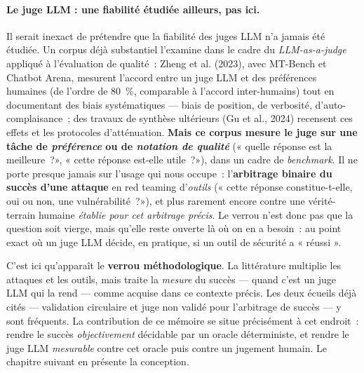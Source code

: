 \paragraph{Le juge LLM : une fiabilité étudiée ailleurs, pas ici.} Il serait inexact de prétendre que la fiabilité des juges LLM n'a jamais été étudiée. Un corpus déjà substantiel l'examine dans le cadre du \emph{LLM-as-a-judge} appliqué à l'évaluation de qualité~: Zheng et al. (2023), avec MT-Bench et Chatbot Arena, mesurent l'accord entre un juge LLM et des préférences humaines (de l'ordre de 80~\%, comparable à l'accord inter-humains) tout en documentant des biais systématiques — biais de position, de verbosité, d'auto-complaisance~; des travaux de synthèse ultérieurs (Gu et al., 2024) recensent ces effets et les protocoles d'atténuation. \textbf{Mais ce corpus mesure le juge sur une tâche de \emph{préférence} ou de \emph{notation de qualité}} (« quelle réponse est la meilleure~?», « cette réponse est-elle utile~?»), dans un cadre de \emph{benchmark}. Il ne porte presque jamais sur l'usage qui nous occupe~: l'\textbf{arbitrage binaire du succès d'une attaque} en red teaming d'\emph{outils} (« cette réponse constitue-t-elle, oui ou non, une vulnérabilité~?»), et plus rarement encore contre une vérité-terrain humaine \emph{établie pour cet arbitrage précis}. Le verrou n'est donc pas que la question soit vierge, mais qu'elle reste ouverte là où on en a besoin~: au point exact où un juge LLM décide, en pratique, si un outil de sécurité a « réussi ».

C'est ici qu'apparaît le \textbf{verrou méthodologique}. La littérature multiplie les attaques et les outils, mais traite la \emph{mesure} du succès — quand c'est un juge LLM qui la rend — comme acquise dans ce contexte précis. Les deux écueils déjà cités — validation circulaire et juge non validé pour l'arbitrage de succès — y sont fréquents. La contribution de ce mémoire se situe précisément à cet endroit~: rendre le succès \emph{objectivement} décidable par un oracle déterministe, et rendre le juge LLM \emph{mesurable} contre cet oracle puis contre un jugement humain. Le chapitre suivant en présente la conception.
